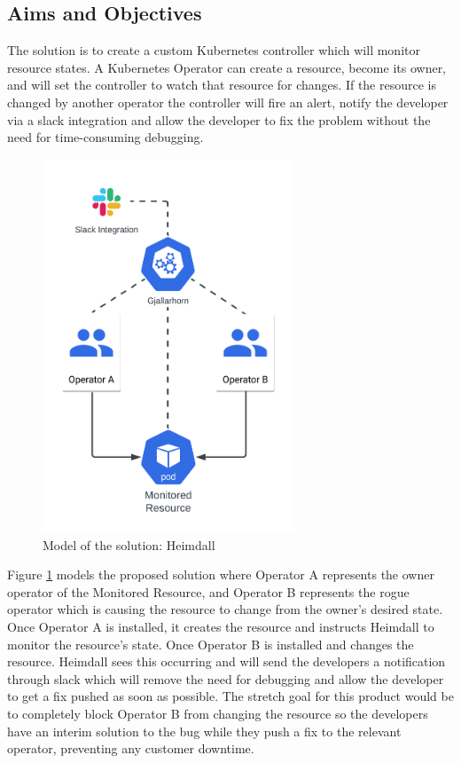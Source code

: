\documentclass{article}
\begin{document}
\subsection{Aims and Objectives}
The solution is to create a custom Kubernetes controller which will monitor resource states. A Kubernetes Operator can create a resource, become its owner, and will set the controller to watch that resource for changes. If the resource is changed by another operator the controller will fire an alert, notify the developer via a slack integration and allow the developer to fix the problem without the need for time-consuming debugging. 

\begin{figure}[!hb]
    \centering
    \includegraphics[width=75mm]{solution-model.png}
    \caption{Model of the solution: Heimdall}
    \label{solution-model}
\end{figure}

Figure \ref{solution-model} models the proposed solution where Operator A represents the owner operator of the Monitored Resource, and Operator B represents the rogue operator which is causing the resource to change from the owner’s desired state. Once Operator A is installed, it creates the resource and instructs Heimdall to monitor the resource’s state. Once Operator B is installed and changes the resource. Heimdall sees this occurring and will send the developers a notification through slack which will remove the need for debugging and allow the developer to get a fix pushed as soon as possible. The stretch goal for this product would be to completely block Operator B from changing the resource so the developers have an interim solution to the bug while they push a fix to the relevant operator, preventing any customer downtime.
\end{document}
